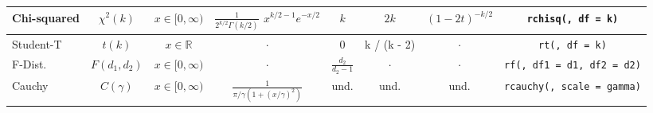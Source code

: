 \documentclass[10pt]{article}
\begin{document}
\begin{center}
\begin{tabular}{l||c|c|c|c|c|c|c}
Chi-squared & $\chi^2(k)$ & $x \in [0, \infty)$ & $\frac{1}{2^{k/2}\Gamma(k/2)}$ $x^{k/2 - 1} e^{-x/2}$ & $k$ & $2k$ & $(1- 2t)^{-k/2}$ & \texttt{rchisq(, df = k)} \\ \hline
Student-T & $t(k)$ & $x \in \mathbb{R}$ & $\cdot$  & 0 & k / (k - 2) & $\cdot$ & \texttt{rt(, df = k)} \\ \hline
F-Dist. & $F(d_1, d_2)$ & $x \in [0, \infty)$ & $\cdot$ & $\frac{d_2}{d_2 - 1}$ & $\cdot$ & $\cdot$ & \texttt{rf(, df1 = d1, df2 = d2)} \\ \hline
Cauchy & $C(\gamma)$ & $x \in [0, \infty)$ & $\frac{1}{\pi/\gamma(1 + (x/\gamma)^2)}$ & und. & und. & und. & \texttt{rcauchy(, scale = gamma)}
\end{tabular}
\end{center}




\end{document}
